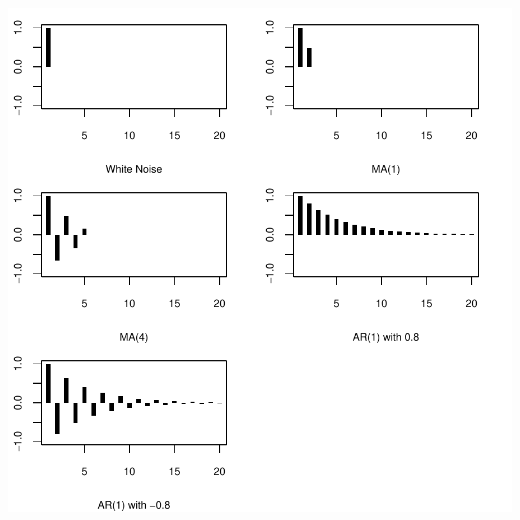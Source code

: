 \documentclass[a4paper]{article}
\begin{document}
\begin{center}
\includegraphics{Companion-017}
\end{center}
\end{document}
